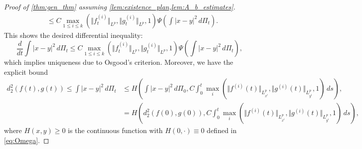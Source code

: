 \documentclass[10pt,oneside]{amsart}
\numberwithin{equation}{section}
\numberwithin{definition}{section}
\numberwithin{theorem}{section}
\numberwithin{lemma}{section}
\begin{document}
\begin{proof}[Proof of \cref{thm:gen_thm} assuming \cref{lem:existence_plan,lem:A_b_estimates}]
\begin{align*}
    &\leq C\max_{1\leq i \leq k}(\Vert f_{t}^{(i)}\Vert _{L^{p}},\Vert g_{t}^{(i)}\Vert _{L^{p}},1)\Psi\left(\int|x-y|^{2}\,d\Pi_{t}\right).
  \end{align*}
  This shows the desired differential inequality:
  \begin{equation*}
    \frac{d}{dt}\int|x-y|^{2}\,d\Pi_{t}\leq C\max_{1\leq i \leq k}( \Vert f_{t}^{(i)}\Vert _{L^{p}},\Vert g_{t}^{(i)}\Vert _{L^{p}},1) \Psi\left(\int|x-y|^{2}\,d\Pi_{t}\right),
  \end{equation*}
  which implies uniqueness due to Osgood's criterion. Moreover, we have the explicit bound
  \begin{align*}
    d_2^2(f(t),g(t))  \leq \int |x-y|^2\,d\Pi_t	
    & \leq H\left(\int |x-y|^2\,d\Pi_0,
    C \int_{0}^{t}\max_{i}(\Vert f^{(i)}(t)\Vert_{L^p_{x^i}},\Vert g^{(i)}(t)\Vert_{L^p_{y^i}},1) \,ds
  \right),\\
  & =H\left(d_2^2(f(0),g(0)),
    C \int_{0}^{t}\max_{i}(\Vert f^{(i)}(t)\Vert_{L^p_{x^i}},\Vert g^{(i)}(t)\Vert_{L^p_{y^i}},1) \,ds
  \right),
  \end{align*}
  where $H(x,y)\geq 0$ is the continuous function with $H(0,\cdot)\equiv 0$ defined in \cref{eq:Omega}.
\end{proof}

\end{document}
